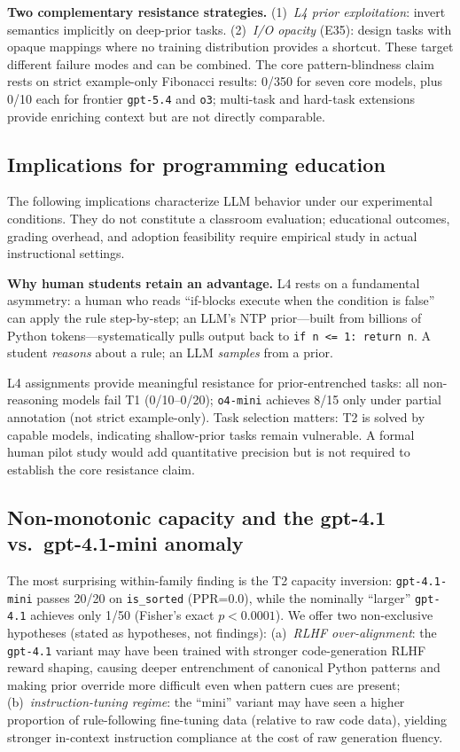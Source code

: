 \textbf{Two complementary resistance strategies.} (1)~\emph{L4 prior exploitation}: invert semantics implicitly on deep-prior tasks. (2)~\emph{I/O opacity} (E35): design tasks with opaque mappings where no training distribution provides a shortcut. These target different failure modes and can be combined. The core pattern-blindness claim rests on strict example-only Fibonacci results: 0/350 for seven core models, plus 0/10 each for frontier \texttt{gpt-5.4} and \texttt{o3}; multi-task and hard-task extensions provide enriching context but are not directly comparable.

\subsection{Implications for programming education}

The following implications characterize LLM behavior under our experimental conditions. They do not constitute a classroom evaluation; educational outcomes, grading overhead, and adoption feasibility require empirical study in actual instructional settings.

\noindent\textbf{Why human students retain an advantage.}
L4 rests on a fundamental asymmetry: a human who reads ``if-blocks execute when the condition is false'' can apply the rule step-by-step; an LLM's NTP prior---built from billions of Python tokens---systematically pulls output back to \texttt{if n <= 1: return n}. A student \emph{reasons} about a rule; an LLM \emph{samples} from a prior.

L4 assignments provide meaningful resistance for prior-entrenched tasks: all non-reasoning models fail T1 (0/10--0/20); \texttt{o4-mini} achieves 8/15 only under partial annotation (not strict example-only). Task selection matters: T2 is solved by capable models, indicating shallow-prior tasks remain vulnerable. A formal human pilot study would add quantitative precision but is not required to establish the core resistance claim.

\subsection{Non-monotonic capacity and the gpt-4.1 vs.\ gpt-4.1-mini anomaly}
\label{sec:nonmonotonic}
The most surprising within-family finding is the T2 capacity inversion: \texttt{gpt-4.1-mini} passes 20/20 on \texttt{is\_sorted} (PPR=0.0), while the nominally ``larger'' \texttt{gpt-4.1} achieves only 1/50 (Fisher's exact $p < 0.0001$). We offer two non-exclusive hypotheses (stated as hypotheses, not findings): (a)~\emph{RLHF over-alignment}: the \texttt{gpt-4.1} variant may have been trained with stronger code-generation RLHF reward shaping, causing deeper entrenchment of canonical Python patterns and making prior override more difficult even when pattern cues are present; (b)~\emph{instruction-tuning regime}: the ``mini'' variant may have seen a higher proportion of rule-following fine-tuning data (relative to raw code data), yielding stronger in-context instruction compliance at the cost of raw generation fluency.

